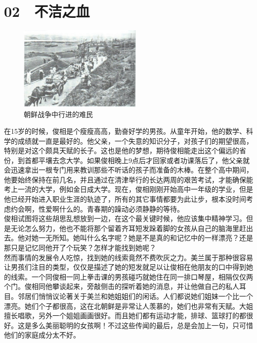 \fancyhead[RO]{\thepage}
\fancyhead[LE]{\thepage}
\fancyfoot[LE,RO]{}
\fancyfoot[LO,CE]{}
\fancyfoot[CO,RE]{}
\chapter*{02 {\FA } 不洁之血}
\begin{figure}[!htbp]
	\centering
	\includegraphics[width=6cm]{./Chapters/Images/02.jpg}
	\caption*{朝鲜战争中行进的难民}
\end{figure}


在15岁的时候，俊相是个瘦瘦高高，勤奋好学的男孩。从童年开始，他的数学、科学的成绩就一直是最好的。他父亲，一个失意的知识分子，对孩子们的期望很高，特别是对这个颇具天赋的长子。这也是他的梦想，期待俊相能走出这个偏远的省份，到首都平壤去念大学。如果俊相晚上9点后才回家或者功课落后了，他父亲就会迅速拿出一根专门用来教训那些不听话的孩子而准备的木棒。在整个高中期间，他要始终保持在前几名，并且通过在清津举行的长达两周的艰苦考试，才能确保能考上一流的大学，例如金日成大学。现在，俊相刚刚开始高中一年级的学业，但是他已经开始进入职业生涯的轨迹了，所有的其它事情都要为此让步，根本没时间考虑约会啊，性爱啊什么的。青春期的躁动必须静静的等待。\\

俊相试图将这些胡思乱想放到一边，在这个最关键时候，他应该集中精神学习。但是无论怎么努力，他也不能将那个留着齐耳短发跺着脚的女孩从自己的脑海里赶出去。他对她一无所知。她叫什么名字呢？她是不是真的和记忆中的一样漂亮？还是那只是记忆同他开了个玩笑？怎样才能找到她呢？\\

然而事情的发展令人吃惊，找到她的线索竟然不费吹灰之力。美兰属于那种很容易让男孩们注目的类型，仅仅是描述了她的短发就足以让俊相在他朋友的口中得到她的线索。一个同俊相一同上拳击课的男孩碰巧就她住在同一排口琴屋，相隔仅仅两个门。俊相同他攀谈起来，旁敲侧击的探听着她的消息，并让他做自己的私人耳目。邻居们悄悄议论著关于美兰和她姐姐们的闲话。人们都说她们姐妹一个比一个漂亮。她们个子都很高，这在北朝鲜是非常让人羡慕的，她们也非常有天赋。大姐擅长唱歌，另外一个姐姐画画很好。而且她们都有运动才能，排球、篮球打的都很好。这是多么美丽聪明的女孩啊！不过这些传闻的最后，总是会加上一句，只可惜他们的家庭成分太不好。\\

